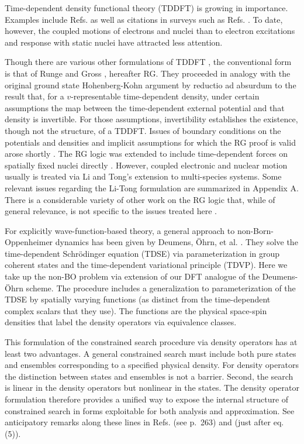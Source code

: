 \documentclass[aps,preprint]{revtex4}%
\begin{document}
\noindent Time-dependent density functional theory (TDDFT) is
growing in importance. Examples include Refs.
\cite{Teil92,Stener95,Saalmann96,Tong97,Serra97a,Ullrich97,AG97,Vignale97,Calvayrac98,Reinhard98,Ullrich98,Telnov98,Tong98,Campillo99,Vasiliev99,Knospe99,Hessler}
as well as citations in surveys such as Refs.
\cite{Gross96,Casida95}. To date, however, the coupled motions of
electrons and nuclei than to electron excitations and response with
static nuclei have attracted less attention.

Though there are various other formulations of TDDFT
\cite{Bartolotti81,DebGhosh82,KD86}, the conventional form is that of Runge
and Gross \cite{RG84}, hereafter RG. They proceeded in analogy with the
original ground state Hohenberg-Kohn argument \cite{HK} by reductio ad
absurdum to the result that, for a $v$-representable time-dependent density,
under certain assumptions the map between the time-dependent external
potential and that density is invertible. For those assumptions, invertibility
establishes the existence, though not the structure, of a TDDFT. Issues of
boundary conditions on the potentials and densities and implicit assumptions
for which the RG proof is valid arose shortly \cite{Xu85,Dhara87}. The RG
logic was extended to include time-dependent forces on spatially fixed nuclei
directly \cite{KD86,Raj94A,RajBuot94B}. However, coupled electronic and
nuclear motion usually is treated via Li and Tong's extension \cite{LiTong86}
to multi-species systems. Some relevant issues regarding the Li-Tong
formulation are summarized in Appendix A. There is a considerable variety of
other work on the RG logic that, while of general relevance, is not specific
to the issues treated here \cite{Qian98,Chermyak00}.

For explicitly wave-function-based theory, a general approach to
non-Born-Oppenheimer dynamics has been given by Deumens, \"Ohrn, et al.
\cite{DeumensA,DeumensB}. They solve the time-dependent Schr\"odinger equation
(TDSE) via parameterization in group coherent states and the time-dependent
variational principle (TDVP). Here we take up the non-BO problem via extension
of our DFT analogue \cite{BLWSBT99a,BLWSBT00a} of the Deumens-\"Ohrn scheme.
The procedure includes a generalization to parameterization of the TDSE by
spatially varying functions (as distinct from the time-dependent complex
scalars that they use). The functions are the physical space-spin densities
that label the density operators via equivalence classes.

This formulation of the constrained search procedure
\cite{Levy79,LevyPerdew85,Lieb} via density operators has at least two
advantages. A general constrained search must include both pure states and
ensembles corresponding to a specified physical density. For density operators
the distinction between states and ensembles is not a barrier. Second, the
search is linear in the density operators but nonlinear in the states. The
density operator formulation therefore provides a unified way to expose the
internal structure of constrained search in forms exploitable for both
analysis and approximation. See anticipatory remarks along these lines in
Refs. \cite{Lieb} (see p.~263) and \cite{KD86} (just after eq. (5)).
\end{document}
